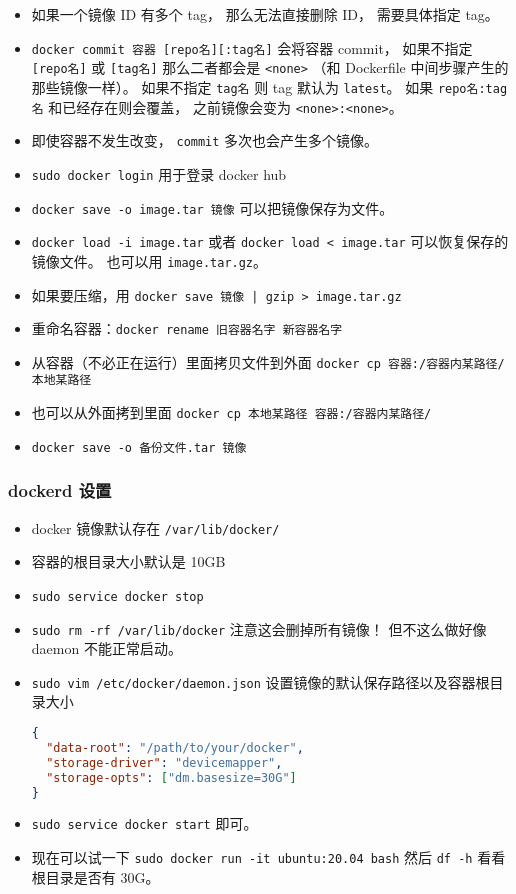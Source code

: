 \begin{itemize}
\item 如果一个镜像 ID 有多个 tag， 那么无法直接删除 ID， 需要具体指定 tag。
\item \verb`docker commit 容器 [repo名][:tag名]` 会将容器 commit， 如果不指定 \verb|[repo名]| 或 \verb|[tag名]| 那么二者都会是 \verb|<none>| （和 Dockerfile 中间步骤产生的那些镜像一样）。 如果不指定 \verb|tag名| 则 tag 默认为 \verb|latest|。 如果 \verb|repo名:tag名| 和已经存在则会覆盖， 之前镜像会变为 \verb|<none>:<none>|。
\item 即使容器不发生改变， \verb|commit| 多次也会产生多个镜像。
\item \verb`sudo docker login` 用于登录 docker hub
\item \verb|docker save -o image.tar 镜像| 可以把镜像保存为文件。
\item \verb|docker load -i image.tar| 或者 \verb|docker load < image.tar| 可以恢复保存的镜像文件。 也可以用 \verb|image.tar.gz|。
\item 如果要压缩，用 \verb`docker save 镜像 | gzip > image.tar.gz`
\item 重命名容器：\verb|docker rename 旧容器名字 新容器名字|
\item 从容器（不必正在运行）里面拷贝文件到外面 \verb|docker cp 容器:/容器内某路径/ 本地某路径|
\item 也可以从外面拷到里面 \verb|docker cp 本地某路径 容器:/容器内某路径/|
\item \verb|docker save -o 备份文件.tar 镜像|
\end{itemize}

\subsubsection{dockerd 设置}
\begin{itemize}
\item docker 镜像默认存在 \verb|/var/lib/docker/|
\item 容器的根目录大小默认是 10GB
\item \verb|sudo service docker stop|
\item \verb|sudo rm -rf /var/lib/docker| 注意这会删掉所有镜像！ 但不这么做好像 daemon 不能正常启动。
\item \verb|sudo vim /etc/docker/daemon.json| 设置镜像的默认保存路径以及容器根目录大小
\begin{lstlisting}[language=json]
{
  "data-root": "/path/to/your/docker",
  "storage-driver": "devicemapper",
  "storage-opts": ["dm.basesize=30G"]
}
\end{lstlisting}
\item \verb|sudo service docker start| 即可。
\item 现在可以试一下 \verb|sudo docker run -it ubuntu:20.04 bash| 然后 \verb|df -h| 看看根目录是否有 30G。
\end{itemize}


